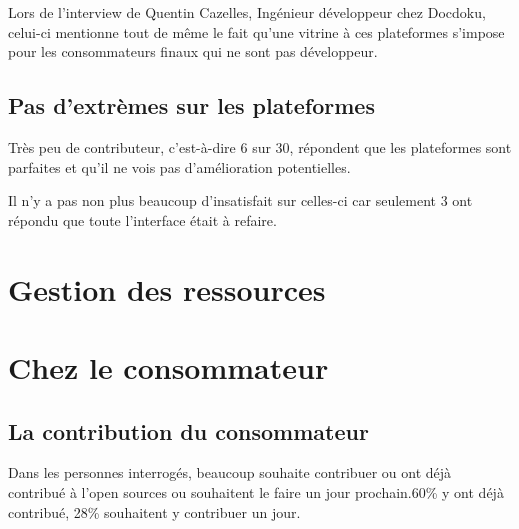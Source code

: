 			Lors de l'interview de Quentin Cazelles, Ingénieur développeur chez Docdoku, celui-ci mentionne tout de même le fait qu'une vitrine à ces plateformes s'impose pour les consommateurs finaux qui ne sont pas développeur.

			\begin{center}
				\textit{
				}
			\end{center}

			\newpage

		\subsection{Pas d'extrèmes sur les plateformes}

			Très peu de contributeur, c'est-à-dire 6 sur 30, répondent que les plateformes sont parfaites et qu'il ne vois pas d'amélioration potentielles.

			Il n'y a pas non plus beaucoup d'insatisfait sur celles-ci car seulement 3 ont répondu que toute l'interface était à refaire.

	\section{Gestion des ressources}

	\newpage
	\section{Chez le consommateur}

		\subsection{La contribution du consommateur}

		Dans les personnes interrogés, beaucoup souhaite contribuer ou ont déjà contribué à l'open sources ou souhaitent le faire un jour prochain.60\% y ont déjà contribué, 28\% souhaitent y contribuer un jour.

